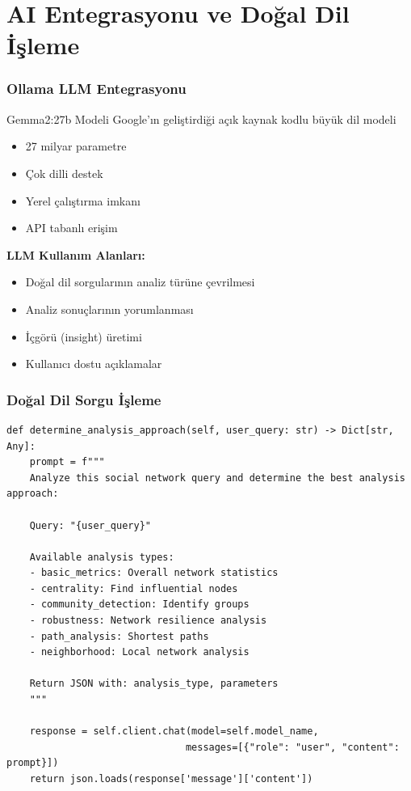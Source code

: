 \documentclass[aspectratio=169]{beamer}
\begin{document}
\section{AI Entegrasyonu ve Doğal Dil İşleme}

\begin{frame}
\frametitle{Ollama LLM Entegrasyonu}
\begin{block}{Gemma2:27b Modeli}
Google'ın geliştirdiği açık kaynak kodlu büyük dil modeli
\begin{itemize}
    \item 27 milyar parametre
    \item Çok dilli destek
    \item Yerel çalıştırma imkanı
    \item API tabanlı erişim
\end{itemize}
\end{block}

\vspace{0.3cm}
\textbf{LLM Kullanım Alanları:}
\begin{itemize}
    \item Doğal dil sorgularının analiz türüne çevrilmesi
    \item Analiz sonuçlarının yorumlanması
    \item İçgörü (insight) üretimi
    \item Kullanıcı dostu açıklamalar
\end{itemize}
\end{frame}

\begin{frame}[fragile]
\frametitle{Doğal Dil Sorgu İşleme}
\begin{lstlisting}[caption=LLM ile Analiz Türü Belirleme]
def determine_analysis_approach(self, user_query: str) -> Dict[str, Any]:
    prompt = f"""
    Analyze this social network query and determine the best analysis approach:
    
    Query: "{user_query}"
    
    Available analysis types:
    - basic_metrics: Overall network statistics
    - centrality: Find influential nodes
    - community_detection: Identify groups
    - robustness: Network resilience analysis
    - path_analysis: Shortest paths
    - neighborhood: Local network analysis
    
    Return JSON with: analysis_type, parameters
    """
    
    response = self.client.chat(model=self.model_name, 
                               messages=[{"role": "user", "content": prompt}])
    return json.loads(response['message']['content'])
\end{lstlisting}
\end{frame}
\end{document}
